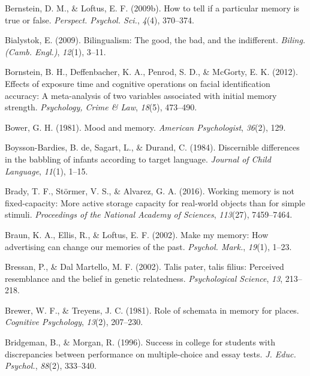 \documentclass[
]{krantz}
\newlength{\cslhangindent}
\newlength{\cslentryspacingunit} %
\newenvironment{CSLReferences}[2] %
 {%
  \setlength{\parindent}{0pt}
  \ifodd #1
  \let\oldpar\par
  \def\par{\hangindent=\cslhangindent\oldpar}
  \fi
  \setlength{\parskip}{#2\cslentryspacingunit}
 }%
 {}
\begin{document}
\begin{CSLReferences}{1}{0}
\leavevmode{}%
Bernstein, D. M., \& Loftus, E. F. (2009b). How to tell if a particular memory is true or false. \emph{Perspect. Psychol. Sci.}, \emph{4}(4), 370--374.

\leavevmode{}%
Bialystok, E. (2009). Bilingualism: The good, the bad, and the indifferent. \emph{Biling. (Camb. Engl.)}, \emph{12}(1), 3--11.

\leavevmode{}%
Bornstein, B. H., Deffenbacher, K. A., Penrod, S. D., \& McGorty, E. K. (2012). Effects of exposure time and cognitive operations on facial identification accuracy: A meta-analysis of two variables associated with initial memory strength. \emph{Psychology, Crime \& Law}, \emph{18}(5), 473--490.

\leavevmode{}%
Bower, G. H. (1981). Mood and memory. \emph{American Psychologist}, \emph{36}(2), 129.

\leavevmode{}%
Boysson-Bardies, B. de, Sagart, L., \& Durand, C. (1984). Discernible differences in the babbling of infants according to target language. \emph{Journal of Child Language}, \emph{11}(1), 1--15.

\leavevmode{}%
Brady, T. F., Störmer, V. S., \& Alvarez, G. A. (2016). Working memory is not fixed-capacity: More active storage capacity for real-world objects than for simple stimuli. \emph{Proceedings of the National Academy of Sciences}, \emph{113}(27), 7459--7464.

\leavevmode{}%
Braun, K. A., Ellis, R., \& Loftus, E. F. (2002). Make my memory: How advertising can change our memories of the past. \emph{Psychol. Mark.}, \emph{19}(1), 1--23.

\leavevmode{}%
Bressan, P., \& Dal Martello, M. F. (2002). Talis pater, talis filius: Perceived resemblance and the belief in genetic relatedness. \emph{Psychological Science}, \emph{13}, 213--218.

\leavevmode{}%
Brewer, W. F., \& Treyens, J. C. (1981). Role of schemata in memory for places. \emph{Cognitive Psychology}, \emph{13}(2), 207--230.

\leavevmode{}%
Bridgeman, B., \& Morgan, R. (1996). Success in college for students with discrepancies between performance on multiple-choice and essay tests. \emph{J. Educ. Psychol.}, \emph{88}(2), 333--340.


\end{CSLReferences}
\end{document}

